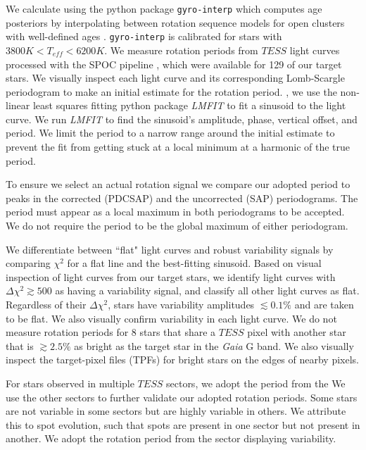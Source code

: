 
We calculate  using the python package \texttt{gyro-interp} which computes age posteriors by interpolating between rotation sequence models for open clusters with well-defined ages \citep{2023ApJ...947L...3B}. \texttt{gyro-interp} is calibrated for stars with $3800 K < T_{eff} < 6200 K$. We measure rotation periods from $TESS$ light curves processed with the SPOC pipeline \citep{2016SPIE.9913E..3EJ}, which were available for 129 of our target stars. We visually inspect each light curve and its corresponding Lomb-Scargle periodogram \citep{1976Ap&SS..39..447L, 1982ApJ...263..835S} to make an initial estimate for the rotation period. , we use the non-linear least squares fitting python package \textit{LMFIT} \citep{2016ascl.soft06014N} to fit a sinusoid to the light curve. We run \textit{LMFIT} to find the sinusoid's amplitude, phase, vertical offset, and period. We limit the period to a narrow range around the initial estimate to prevent the fit from getting stuck at a local minimum at a harmonic of the true period.  

To ensure we select an actual rotation signal we compare our adopted period to peaks in the corrected (PDCSAP) and the uncorrected (SAP) periodograms. The period must appear as a local maximum in both periodograms to be accepted. We do not require the period to be the global maximum of either periodogram.

We differentiate between ``flat" light curves and robust variability signals by comparing $\chi^{2}$ for a flat line and the best-fitting sinusoid. Based on visual inspection of light curves from our target stars, we identify light curves with $\Delta \chi^{2} \gtrsim500$ as having a variability signal, and classify all other light curves as flat. Regardless of their $\Delta  \chi^{2}$,  stars have variability amplitudes $\lesssim0.1\%$ and are taken to be flat. We also visually confirm variability in each light curve. We do not measure rotation periods for 8 stars that share a $TESS$ pixel with another star that is $\gtrsim2.5\%$ as bright as the target star in the \textit{Gaia} G band. We also visually inspect the target-pixel files (TPFs) for bright stars on the edges of nearby pixels.

For stars observed in multiple $TESS$ sectors, we adopt the period from the  We use the other sectors to further validate our adopted rotation periods. Some stars are not variable in some sectors but are highly variable in others. We attribute this to spot evolution, such that spots are present in one sector but not present in another. We adopt the rotation period from the sector displaying variability.

